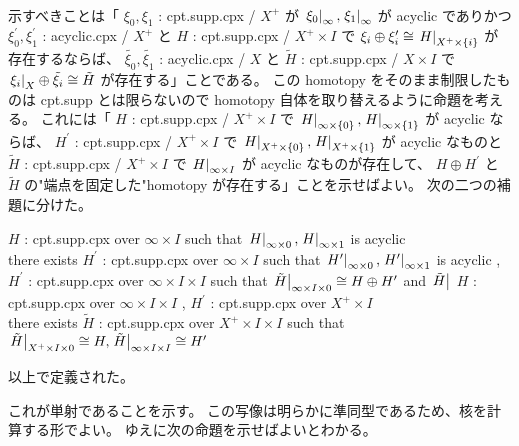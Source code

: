 \documentclass[dvipdfmx]{jsarticle}
\begin{document}
\begin{Proof}[\(\xi\) のとり方によらないこと]
\itemprof
  \WIP \\
  示すべきことは「 \(\xi_0 , \xi_1\) : cpt.supp.cpx / \(X^+\) が \(\left. {\xi_0} \right| _{\infty} , \left. {\xi_1} \right| _{\infty}\) が acyclic でありかつ \(\xi_0^\prime , \xi_1^\prime\) : acyclic.cpx / \(X^+\) と \(H\) : cpt.supp.cpx / \(X^+ \times I\) で \(\xi_i \oplus \xi_i^\prime \cong \left. {H} \right| _{X^+ \times \{i\}}\) が存在するならば、 \(\tilde{\xi_0} , \tilde{\xi_1}\) : acyclic.cpx / \(X\) と \(\tilde{H}\) : cpt.supp.cpx / \(X \times I\) で \(\left. {\xi_i} \right| _{X} \oplus \tilde{\xi_i} \cong \tilde{H}\) が存在する」ことである。
  この homotopy をそのまま制限したものは cpt.supp とは限らないので homotopy 自体を取り替えるように命題を考える。
  これには「 \(H\) : cpt.supp.cpx / \(X^+ \times I\) で \(\left. {H} \right| _{\infty \times \{0\}} , \left. {H} \right| _{\infty \times \{1\}}\) が acyclic ならば、 \(H^\prime\) : cpt.supp.cpx / \(X^+ \times I\) で \(\left. {H} \right| _{X^+ \times \{0\}} , \left. {H} \right| _{X^+ \times \{1\}}\) が acyclic なものと \(\tilde{H}\) : cpt.supp.cpx / \(X^+ \times I\) で \(\left. {H} \right| _{\infty \times I}\) が acyclic なものが存在して、 \(H \oplus H^\prime\) と \(\tilde{H}\) の"端点を固定した"homotopy が存在する」ことを示せばよい。
  次の二つの補題に分けた。
\end{Proof}

\begin{Theorem}
  \itemprop
  \For \(H\) : cpt.supp.cpx over \(\infty \times I\) such that \(\left. {H} \right| _{\infty \times 0} , \left. {H} \right| _{\infty \times 1}\) is acyclic \\
  \Then there exists \(H^\prime\) : cpt.supp.cpx over \(\infty \times I\) such that \(\left. {H^\prime} \right| _{\infty \times 0} , \left. {H^\prime} \right| _{\infty \times 1}\) is acyclic , \(H ^\prime\) : cpt.supp.cpx over \(\infty \times I \times I\) such that \(\left. {\tilde{H}} \right| _{\infty \times I \times 0} \cong H \oplus H^\prime\) and \(\left. {\tilde{H}} \right| _{}\)
\itemprop
  \For \(H\) : cpt.supp.cpx over \(\infty \times I \times I\) , \(H^\prime\) : cpt.supp.cpx over \(X^+ \times I\) \\
  \Then there exists \(\tilde{H}\) : cpt.supp.cpx over \(X^+ \times I \times I\) such that \(\left. {\tilde{H}} \right| _{X^+ \times I \times 0} \cong H , \left. {\tilde{H}} \right| _{\infty \times I \times I} \cong H^\prime\)
\end{Theorem}

以上で定義された。

これが単射であることを示す。
この写像は明らかに準同型であるため、核を計算する形でよい。
ゆえに次の命題を示せばよいとわかる。
\end{document}
